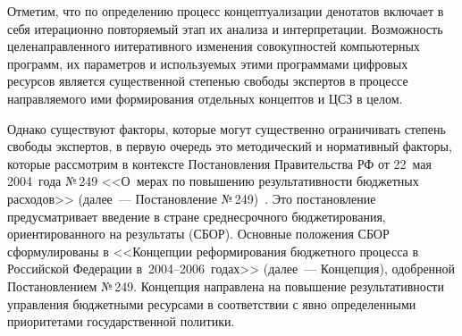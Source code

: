 \begin{multicols}{2}
   Отметим, что по определению процесс кон\-цептуализации денотатов включает в себя 
ите\-рационно повторяемый этап их анализа и интер\-претации. Возможность 
целенаправленного и\linebreak итеративного изменения совокупностей компьютерных программ, их 
параметров и используемых этими программами цифровых ресурсов является существенной 
степенью свободы экспертов в процессе направляемого ими формирования отдельных 
концептов и ЦСЗ в целом.
   
   Однако существуют факторы, которые могут сущест\-венно ограничивать степень свободы 
экспер\-тов, в первую очередь это методический и нормативный факторы, которые 
рассмотрим в контексте Постановления Правительства РФ от 22~мая 2004~года №\,249 
<<О~мерах по повышению результативности бюджетных расходов>> (далее~--- 
Постановление №\,249)~\cite{20zat}. Это постановление преду\-смат\-ри\-ва\-ет введение в 
стране среднесрочного бюджетирования, ориентированного на результаты (СБОР). 
Основные положения СБОР сформулированы в <<Концепции реформирования бюджетного 
процесса в Российской Федерации в~2004--2006~годах>> (далее~--- Концепция), одобренной 
По\-ста\-нов\-ле\-ни\-ем №\,249. Концепция направлена на повышение результативности управления 
бюджетными ресурсами в соответствии с явно определенными приоритетами 
государственной политики.
   

\end{multicols}
